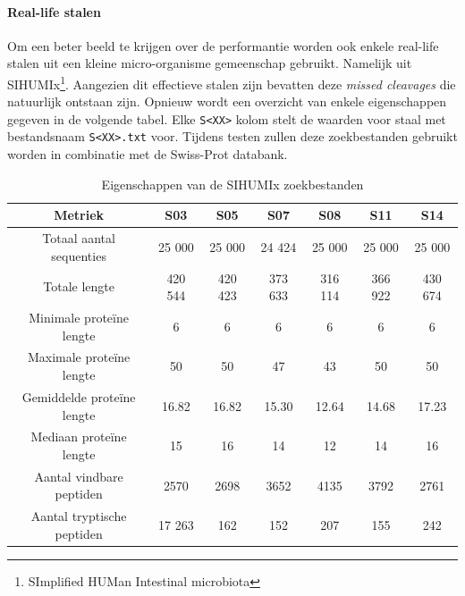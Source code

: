 \documentclass[11pt,dutch,faculty=we,layout=titlefont,underline=false,titleUppercase=true,titleUnderline=true]{ugent2016-report}
\begin{document}
    \paragraph{Real-life stalen}
    Om een beter beeld te krijgen over de performantie worden ook enkele real-life stalen uit een kleine micro-organisme gemeenschap gebruikt.
    Namelijk uit SIHUMIx\footnote{SImplified HUMan Intestinal microbiota}\cite{SIHUMI_first_introduction, SIHUMI_frequently_used}.
    Aangezien dit effectieve stalen zijn bevatten deze \textit{missed cleavages} die natuurlijk ontstaan zijn.
    Opnieuw wordt een overzicht van enkele eigenschappen gegeven in de volgende tabel.
    Elke \texttt{S<XX>} kolom stelt de waarden voor staal met bestandsnaam \texttt{S<XX>.txt} voor.
    Tijdens testen zullen deze zoekbestanden gebruikt worden in combinatie met de Swiss-Prot databank.

    \begin{table}[h!]
        \centering
        \begin{tabular}{ c c c c c c c }
            Metriek                    & S03     & S05     & S07     & S08     & S11     & S14     \\
            \hline\hline
            Totaal aantal sequenties   & 25 000  & 25 000  & 24 424  & 25 000  & 25 000  & 25 000  \\
            Totale lengte              & 420 544 & 420 423 & 373 633 & 316 114 & 366 922 & 430 674 \\
            Minimale proteïne lengte   & 6       & 6       & 6       & 6       & 6       & 6       \\
            Maximale proteïne lengte   & 50      & 50      & 47      & 43      & 50      & 50      \\
            Gemiddelde proteïne lengte & 16.82   & 16.82   & 15.30   & 12.64   & 14.68   & 17.23   \\
            Mediaan proteïne lengte    & 15      & 16      & 14      & 12      & 14      & 16      \\
            Aantal vindbare peptiden   & 2570    & 2698    & 3652    & 4135    & 3792    & 2761    \\
            Aantal tryptische peptiden & 17 263  & 162     & 152     & 207     & 155     & 242     \\
            \hline
        \end{tabular}
        \caption{Eigenschappen van de SIHUMIx zoekbestanden}
        \label{tab:sihumi_zoekbestanden}
    \end{table}
\end{document}
